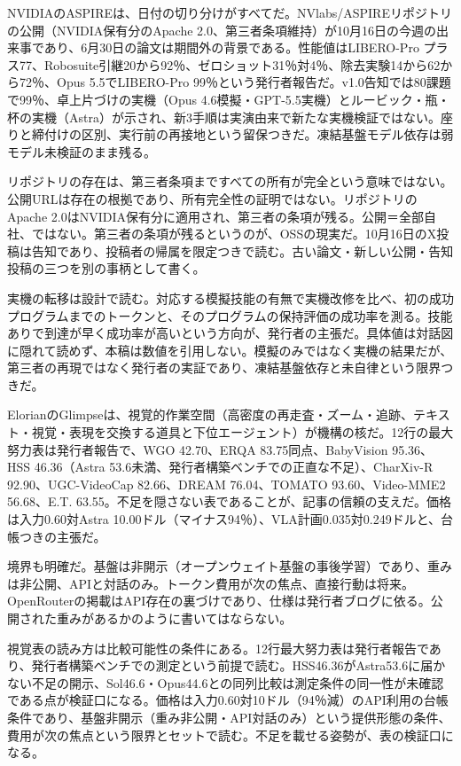 \documentclass[lualatex,a4paper,10pt]{jlreq}
\begin{document}
NVIDIAのASPIREは、日付の切り分けがすべてだ。NVlabs/ASPIREリポジトリの公開（NVIDIA保有分のApache 2.0、第三者条項維持）が10月16日の今週の出来事であり、6月30日の論文は期間外の背景である。性能値はLIBERO-Pro プラス77、Robosuite引継20から92％、ゼロショット31％対4％、除去実験14から62から72％、Opus 5.5でLIBERO-Pro 99％という発行者報告だ。v1.0告知では80課題で99％、卓上片づけの実機（Opus 4.6模擬・GPT-5.5実機）とルービック・瓶・杯の実機（Astra）が示され、新3手順は実演由来で新たな実機検証ではない。座りと締付けの区別、実行前の再接地という留保つきだ。凍結基盤モデル依存は弱モデル未検証のまま残る。
\cite{B57,B56,B89}


リポジトリの存在は、第三者条項まですべての所有が完全という意味ではない。公開URLは存在の根拠であり、所有完全性の証明ではない。リポジトリのApache 2.0はNVIDIA保有分に適用され、第三者の条項が残る。公開＝全部自社、ではない。第三者の条項が残るというのが、OSSの現実だ。10月16日のX投稿は告知であり、投稿者の帰属を限定つきで読む。古い論文・新しい公開・告知投稿の三つを別の事柄として書く。
\cite{B57,B56}


実機の転移は設計で読む。対応する模擬技能の有無で実機改修を比べ、初の成功プログラムまでのトークンと、そのプログラムの保持評価の成功率を測る。技能ありで到達が早く成功率が高いという方向が、発行者の主張だ。具体値は対話図に隠れて読めず、本稿は数値を引用しない。模擬のみではなく実機の結果だが、第三者の再現ではなく発行者の実証であり、凍結基盤依存と未自律という限界つきだ。
\cite{B57,B56,B89}


ElorianのGlimpseは、視覚的作業空間（高密度の再走査・ズーム・追跡、テキスト・視覚・表現を交換する道具と下位エージェント）が機構の核だ。12行の最大努力表は発行者報告で、WGO 42.70、ERQA 83.75同点、BabyVision 95.36、HSS 46.36（Astra 53.6未満、発行者構築ベンチでの正直な不足）、CharXiv-R 92.90、UGC-VideoCap 82.66、DREAM 76.04、TOMATO 93.60、Video-MME2 56.68、E.T. 63.55。不足を隠さない表であることが、記事の信頼の支えだ。価格は入力0.60対Astra 10.00ドル（マイナス94％）、VLA計画0.035対0.249ドルと、台帳つきの主張だ。
\cite{B58,B59,B88}


境界も明確だ。基盤は非開示（オープンウェイト基盤の事後学習）であり、重みは非公開、APIと対話のみ。トークン費用が次の焦点、直接行動は将来。OpenRouterの掲載はAPI存在の裏づけであり、仕様は発行者ブログに依る。公開された重みがあるかのように書いてはならない。
\cite{B58,B59,B88}


視覚表の読み方は比較可能性の条件にある。12行最大努力表は発行者報告であり、発行者構築ベンチでの測定という前提で読む。HSS46.36がAstra53.6に届かない不足の開示、Sol46.6・Opus44.6との同列比較は測定条件の同一性が未確認である点が検証口になる。価格は入力0.60対10ドル（94％減）のAPI利用の台帳条件であり、基盤非開示（重み非公開・API対話のみ）という提供形態の条件、費用が次の焦点という限界とセットで読む。不足を載せる姿勢が、表の検証口になる。
\cite{B58,B59,B88}
\end{document}
